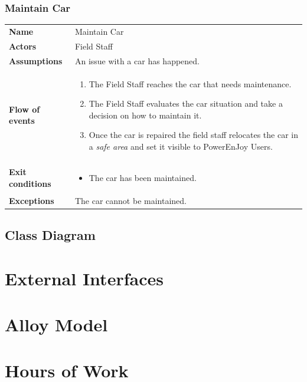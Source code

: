 \documentclass[english]{article}
\newcommand{\safearea}{\textit{safe area }}
\begin{document}
\subsubsection{Maintain Car}
	\begin{center}
	\begin{tabular}{l||p{10cm}}
	\textbf{Name} 
		&Maintain Car\\ [8px]
	\textbf{Actors} 
		& Field Staff\\ [8px]
	\textbf{Assumptions} 
		&An issue with a car has happened.\\
	\textbf{Flow of events}
		& \begin{enumerate}
			\item The Field Staff reaches the car that needs maintenance.
			\item The Field Staff evaluates the car situation and take a decision on how to maintain it. 
			\item Once the car is repaired the field staff relocates the car in a \safearea and set it visible to PowerEnJoy Users.
		\end{enumerate}\\ 
	\textbf{Exit conditions}
		&\begin{itemize}
			\item The car has been maintained.
		\end{itemize}\\
	\textbf{Exceptions}
		&The car cannot be maintained.\\[8px]
	\end{tabular}
	\end{center}

	\subsection{Class Diagram}
\section{External Interfaces}
\section{Alloy Model}
\section{Hours of Work}
\end{document}
